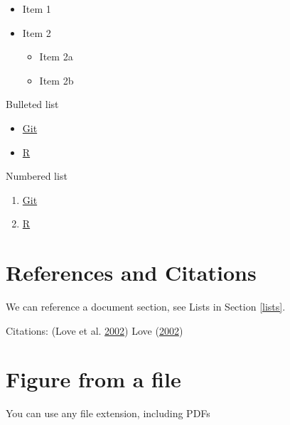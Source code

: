 \documentclass[12pt,]{article}
\providecommand{\tightlist}{%
  \setlength{\itemsep}{0pt}\setlength{\parskip}{0pt}}
\begin{document}
\begin{itemize}
\tightlist
\item
  Item 1
\item
  Item 2

  \begin{itemize}
  \tightlist
  \item
    Item 2a
  \item
    Item 2b
  \end{itemize}
\end{itemize}

Bulleted list

\begin{itemize}[noitemsep,nolistsep,topsep=0pt]

\item \href{https://git-scm.com/book/en/v2/Getting-Started-Installing-Git}{Git}

\item \href{https://cran.r-project.org/bin/windows/base/}{R}

\end{itemize}

Numbered list

\begin{enumerate}[noitemsep,nolistsep,topsep=0pt]

\item \href{https://git-scm.com/book/en/v2/Getting-Started-Installing-Git}{Git}

\item \href{https://cran.r-project.org/bin/windows/base/}{R} 

\end{enumerate}

\section{References and Citations}\label{references-and-citations}

We can reference a document section, see Lists in Section \ref{lists}.

Citations: (Love et al. \protect\hyperlink{ref-Love2002}{2002}) Love
(\protect\hyperlink{ref-Love2002}{2002})

\section{Figure from a file}\label{figure-from-a-file}

You can use any file extension, including PDFs
\end{document}
